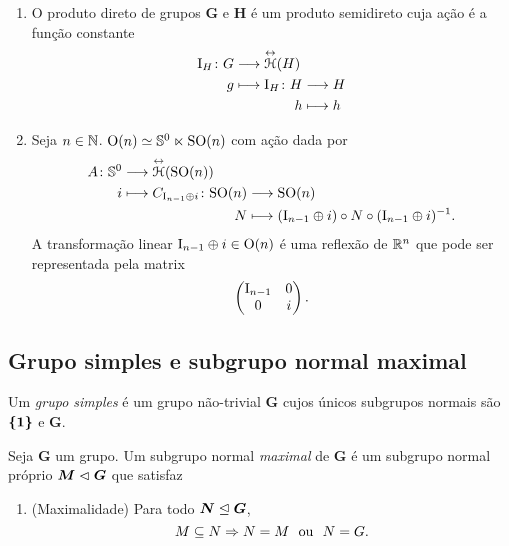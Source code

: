 \begin{example}
	\begin{enumerate}
		\item O produto direto de grupos $\bm G$ e $\bm H$ é um produto semidireto cuja ação é a função constante
	\begin{align*}
		\func{\Id_H}{G}{\Iso{\Homo}(H)}{g}{
			\begin{aligned}[t]
				\func{\Id_H}{H}{H}{h}{h}
			\end{aligned}
		}
	\end{align*}

	\item Seja $n \in \mathbb{N}$. $\operatorname{O}(n) \simeq \mathbb{S}^0 \ltimes \operatorname{SO}(n)$ com ação dada por
		\begin{align*}
			\func{A}{\S^0}{\Aut(\SO(n))}{i}{
				\begin{aligned}[t]
					\func{C_{\Id_{n-1} \oplus i}}{\SO(n)}{\SO(n)}{N}{(\Id_{n-1} \oplus i) \circ N \circ (\Id_{n-1} \oplus i)\inv}.
				\end{aligned}
			}
		\end{align*}
	A transformação linear $\mathrm{I}_{n-1} \oplus i \in \operatorname{O}(n)$ é uma reflexão de $\mathbb{R}^n$ que pode ser representada pela matrix
		\begin{equation*}
			\begin{pmatrix}
				\mathrm{I}_{n-1}	&	0 \\
				0			&	i
			\end{pmatrix}.
		\end{equation*}
	\end{enumerate}
\end{example}













\subsection{Grupo simples e subgrupo normal maximal}

\begin{definition}
Um \emph{grupo simples} é um grupo não-trivial $\bm G$ cujos únicos subgrupos normais são $\bm{\{1\}}$ e $\bm G$.
\end{definition}

\begin{definition}
Seja $\bm G$ um grupo. Um subgrupo normal \emph{maximal} de $\bm G$ é um subgrupo normal próprio $\bm M \mathrel{\lhd} \bm G$ que satisfaz
	\begin{enumerate}
	\item (Maximalidade) Para todo $\bm N \mathrel{\unlhd} \bm G$,
		\begin{equation*}
		M \subseteq N \Rightarrow N = M \text{\ \ ou\ \ } N = G.
		\end{equation*}
	\end{enumerate}
\end{definition}

